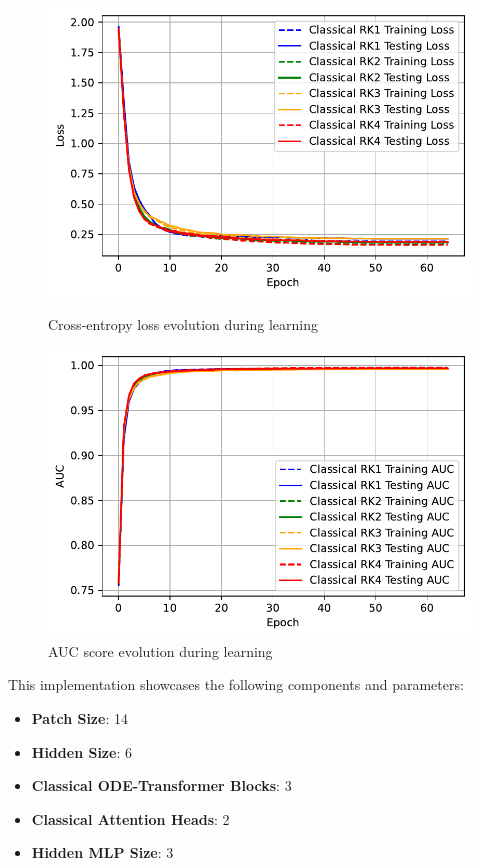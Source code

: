 \documentclass[12pt,a4paper]{report}
\begin{document}
\begin{figure}[th]
  \centering
  \includegraphics[scale=0.88]{./pics/new_pdf_graphs/classical/3_rk_1_dec/classical_transfomer_loss_mnist_rk1_rk2_rk3_rk4.pdf}
  \caption[Cross-entropy loss evolution during learning]{Cross-entropy loss evolution during learning}
  \label{fig:p19}
  \vspace*{\floatsep}
  \centering
  \includegraphics[scale=0.88]{./pics/new_pdf_graphs/classical/3_rk_1_dec/classical_transfomer_auc_mnist_rk1_rk2_rk3_rk4.pdf}
  \caption[AUC score evolution during learning]{AUC score evolution during learning}
  \label{fig:p20}
\end{figure}

This implementation showcases the following components and parameters:
\begin{itemize}
  \item \textbf{Patch Size}: 14
  \item \textbf{Hidden Size}: 6
  \item \textbf{Classical ODE-Transformer Blocks}: 3
  \item \textbf{Classical Attention Heads}: 2
  \item \textbf{Hidden MLP Size}: 3
\end{itemize}
\end{document}

